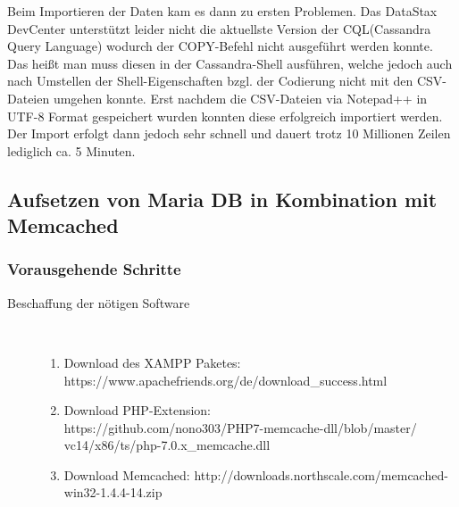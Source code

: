 \documentclass[a4paper, 12pt]{scrartcl}
\begin{document}
Beim Importieren der Daten kam es dann zu ersten Problemen.
Das DataStax DevCenter unterstützt leider nicht die aktuellste Version der CQL(Cassandra Query Language) wodurch der COPY-Befehl nicht ausgeführt werden konnte. Das heißt man muss diesen in der Cassandra-Shell ausführen, welche jedoch auch nach Umstellen der Shell-Eigenschaften bzgl. der Codierung nicht mit den CSV-Dateien umgehen konnte. 
Erst nachdem die CSV-Dateien via Notepad++ in UTF-8 Format gespeichert wurden konnten diese erfolgreich importiert werden.
Der Import erfolgt dann jedoch sehr schnell und dauert trotz 10 Millionen Zeilen lediglich ca. 5 Minuten.







\subsection{Aufsetzen von Maria DB in Kombination mit Memcached}
\subsubsection{Vorausgehende Schritte}
\begin{description}
   \item[Beschaffung der nötigen Software]~\par
   \begin{enumerate}
      \item Download des XAMPP Paketes: \\https://www.apachefriends.org/de/download_success.html
      \item Download PHP-Extension: \\https://github.com/nono303/PHP7-memcache-dll/blob/master/\\vc14/x86/ts/php-7.0.x_memcache.dll
      \item Download Memcached: http://downloads.northscale.com/memcached-win32-1.4.4-14.zip
   \end{enumerate}  
  
\end{description}
\end{document}
